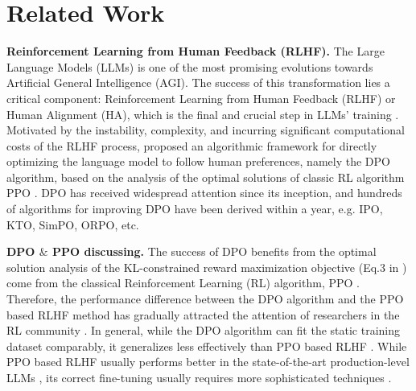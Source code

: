 \section{Related Work}
\label{appendix_related_work}
\textbf{Reinforcement Learning from Human Feedback (RLHF).} The Large Language Models (LLMs) \cite{zhao2023survey,chang2024survey,hadi2024large,minaee2024large,hadi2023survey,achiam2023gpt,bubeck2023sparks} is one of the most promising evolutions towards Artificial General Intelligence (AGI). The success of this transformation lies a critical component: Reinforcement Learning from Human Feedback (RLHF) or Human Alignment (HA), which is the final and crucial step in LLMs' training \cite{arumugam2019deep,ouyang2022training,singh2022flava,bai2022training,dai2023safe}. Motivated by the instability, complexity, and incurring significant computational costs of the RLHF process, \cite{DPO} proposed an algorithmic framework for directly optimizing the language model to follow human preferences, namely the DPO algorithm, based on the analysis of the optimal solutions of classic RL algorithm PPO \cite{schulman2017proximal,engstrom2019implementation}. DPO has received widespread attention since its inception, and hundreds of algorithms for improving DPO have been derived within a year, e.g. IPO\cite{IPO}, KTO\cite{KTO}, SimPO\cite{SimPO}, ORPO\cite{ORPO}, etc. 

\textbf{DPO $\&$ PPO discussing.}
The success of DPO \cite{DPO} benefits from the optimal solution analysis of the KL-constrained reward maximization objective (Eq.3 in \cite{DPO}) come from the classical Reinforcement Learning (RL) algorithm, PPO \cite{PPO}. Therefore, the performance difference between the DPO algorithm and the PPO based RLHF method \cite{PPO-basedRLHF} has gradually attracted the attention of researchers in the RL community \cite{ivison2024unpacking}. In general, while the DPO algorithm can fit the static training dataset comparably, it generalizes less effectively than PPO based RLHF \cite{lin2024limited}. While PPO based RLHF usually performs better in the state-of-the-art production-level LLMs \cite{yan20243d}, its correct fine-tuning usually requires more sophisticated techniques \cite{xu2024dpo}.

